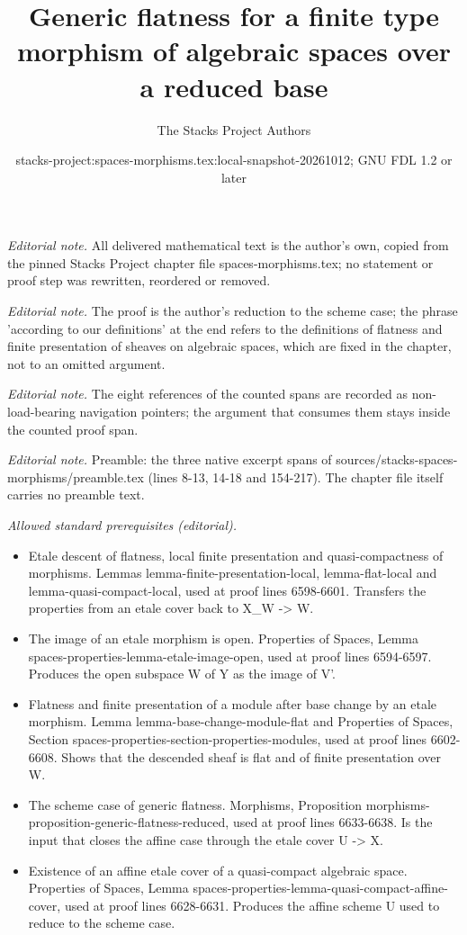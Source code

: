\documentclass[10pt,a4paper]{amsart}
\title{Generic flatness for a finite type morphism of algebraic spaces over a reduced base}
\author{The Stacks Project Authors}
\date{stacks-project:spaces-morphisms.tex:local-snapshot-20261012; GNU FDL 1.2 or later}
\theoremstyle{plain}
\theoremstyle{definition}
\theoremstyle{remark}
\numberwithin{equation}{subsection}
\begin{document}
\maketitle
\setcounter{subsection}{1}
\noindent\textit{Editorial note.} All delivered mathematical text is the author's own, copied from the pinned Stacks Project chapter file spaces-morphisms.tex; no statement or proof step was rewritten, reordered or removed.\par\medskip
\noindent\textit{Editorial note.} The proof is the author's reduction to the scheme case; the phrase 'according to our definitions' at the end refers to the definitions of flatness and finite presentation of sheaves on algebraic spaces, which are fixed in the chapter, not to an omitted argument.\par\medskip
\noindent\textit{Editorial note.} The eight references of the counted spans are recorded as non-load-bearing navigation pointers; the argument that consumes them stays inside the counted proof span.\par\medskip
\noindent\textit{Editorial note.} Preamble: the three native excerpt spans of sources/stacks-spaces-morphisms/preamble.tex (lines 8-13, 14-18 and 154-217). The chapter file itself carries no preamble text.\par\medskip
\noindent\textit{Allowed standard prerequisites (editorial).}\begin{itemize}
\item Etale descent of flatness, local finite presentation and quasi-compactness of morphisms. Lemmas lemma-finite-presentation-local, lemma-flat-local and lemma-quasi-compact-local, used at proof lines 6598-6601. Transfers the properties from an etale cover back to X\_W -> W.
\item The image of an etale morphism is open. Properties of Spaces, Lemma spaces-properties-lemma-etale-image-open, used at proof lines 6594-6597. Produces the open subspace W of Y as the image of V'.
\item Flatness and finite presentation of a module after base change by an etale morphism. Lemma lemma-base-change-module-flat and Properties of Spaces, Section spaces-properties-section-properties-modules, used at proof lines 6602-6608. Shows that the descended sheaf is flat and of finite presentation over W.
\item The scheme case of generic flatness. Morphisms, Proposition morphisms-proposition-generic-flatness-reduced, used at proof lines 6633-6638. Is the input that closes the affine case through the etale cover U -> X.
\item Existence of an affine etale cover of a quasi-compact algebraic space. Properties of Spaces, Lemma spaces-properties-lemma-quasi-compact-affine-cover, used at proof lines 6628-6631. Produces the affine scheme U used to reduce to the scheme case.
\end{itemize}\medskip
\end{document}

